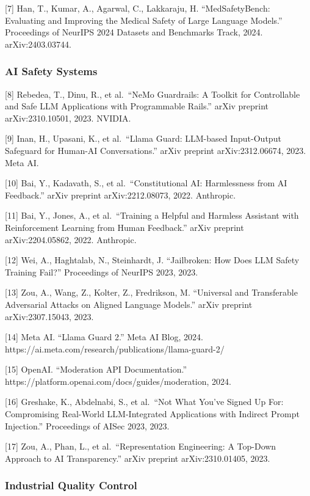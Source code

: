 {[}7{]} Han, T., Kumar, A., Agarwal, C., Lakkaraju, H. ``MedSafetyBench:
Evaluating and Improving the Medical Safety of Large Language Models.''
Proceedings of NeurIPS 2024 Datasets and Benchmarks Track, 2024.
arXiv:2403.03744.

\subsubsection{AI Safety Systems}\label{ai-safety-systems}

{[}8{]} Rebedea, T., Dinu, R., et al.~``NeMo Guardrails: A Toolkit for
Controllable and Safe LLM Applications with Programmable Rails.'' arXiv
preprint arXiv:2310.10501, 2023. NVIDIA.

{[}9{]} Inan, H., Upasani, K., et al.~``Llama Guard: LLM-based
Input-Output Safeguard for Human-AI Conversations.'' arXiv preprint
arXiv:2312.06674, 2023. Meta AI.

{[}10{]} Bai, Y., Kadavath, S., et al.~``Constitutional AI: Harmlessness
from AI Feedback.'' arXiv preprint arXiv:2212.08073, 2022. Anthropic.

{[}11{]} Bai, Y., Jones, A., et al.~``Training a Helpful and Harmless
Assistant with Reinforcement Learning from Human Feedback.'' arXiv
preprint arXiv:2204.05862, 2022. Anthropic.

{[}12{]} Wei, A., Haghtalab, N., Steinhardt, J. ``Jailbroken: How Does
LLM Safety Training Fail?'' Proceedings of NeurIPS 2023, 2023.

{[}13{]} Zou, A., Wang, Z., Kolter, Z., Fredrikson, M. ``Universal and
Transferable Adversarial Attacks on Aligned Language Models.'' arXiv
preprint arXiv:2307.15043, 2023.

{[}14{]} Meta AI. ``Llama Guard 2.'' Meta AI Blog, 2024.
https://ai.meta.com/research/publications/llama-guard-2/

{[}15{]} OpenAI. ``Moderation API Documentation.''
https://platform.openai.com/docs/guides/moderation, 2024.

{[}16{]} Greshake, K., Abdelnabi, S., et al.~``Not What You've Signed Up
For: Compromising Real-World LLM-Integrated Applications with Indirect
Prompt Injection.'' Proceedings of AISec 2023, 2023.

{[}17{]} Zou, A., Phan, L., et al.~``Representation Engineering: A
Top-Down Approach to AI Transparency.'' arXiv preprint arXiv:2310.01405,
2023.

\subsubsection{Industrial Quality
Control}\label{industrial-quality-control}

